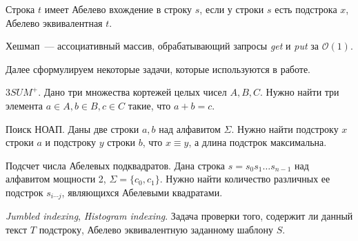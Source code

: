 \begin{definition}
Строка $t$ имеет Абелево вхождение в строку $s$, если у строки $s$ есть подстрока $x$, Абелево эквивалентная $t$.
\end{definition}


\begin{definition}
Хешмап~--- ассоциативный массив, обрабатывающий запросы \textit{get} и \textit{put} за $\mathcal{O}(1)$.
\end{definition}

Далее сформулируем некоторые задачи, которые используются в работе.

\begin{problem}
$3SUM^+$. Дано три множества кортежей целых чисел $A, B, C$. Нужно найти три элемента $a \in A, b \in B, c \in C$ такие, что $a+b=c$.
\end{problem}

\begin{problem}
Поиск НОАП. Даны две строки $a, b$ над алфавитом $\Sigma$. Нужно найти подстроку $x$ строки $a$ и подстроку $y$ строки $b$, что $x \equiv y$, а длина подстрок максимальна.
\end{problem}

\begin{problem}
Подсчет числа Абелевых подквадратов. Дана строка $s=s_0s_1 \ldots s_{n-1}$ над алфавитом мощности 2, $\Sigma = \{c_0, c_1\}$. Нужно найти количество различных ее подстрок $s_{i \cdots j}$, являющихся Абелевыми квадратами.
\end{problem}

\begin{problem}
\textit{Jumbled indexing}, \textit{Histogram indexing}. Задача проверки того, содержит ли данный текст $T$ подстроку, Абелево эквивалентную заданному шаблону $S$.
\end{problem}





